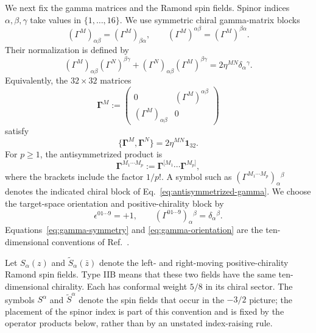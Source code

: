\documentclass[12pt]{article}
\numberwithin{equation}{section}
\newcommand{\id}{\mathbf{1}}
\begin{document}
We next fix the gamma matrices and the Ramond spin fields.  Spinor indices
$\alpha,\beta,\gamma$ take values in $\{1,\ldots,16\}$.  We use symmetric
chiral gamma-matrix blocks
\begin{equation}
(\Gamma^M)_{\alpha\beta}=(\Gamma^M)_{\beta\alpha},
\qquad
(\Gamma^M)^{\alpha\beta}=(\Gamma^M)^{\beta\alpha}.
\label{eq:gamma-symmetry}
\end{equation}
Their normalization is defined by
\begin{equation}
(\Gamma^M)_{\alpha\beta}(\Gamma^N)^{\beta\gamma}
+(\Gamma^N)_{\alpha\beta}(\Gamma^M)^{\beta\gamma}
=2\eta^{MN}\delta_\alpha{}^\gamma.
\label{eq:chiral-clifford}
\end{equation}
Equivalently, the $32\times32$ matrices
\begin{equation}
\boldsymbol\Gamma^M
:=
\begin{pmatrix}
0&(\Gamma^M)^{\alpha\beta}\\
(\Gamma^M)_{\alpha\beta}&0
\end{pmatrix}
\label{eq:dirac-gamma-from-blocks}
\end{equation}
satisfy
\begin{equation}
\{\boldsymbol\Gamma^M,\boldsymbol\Gamma^N\}
=2\eta^{MN}\id_{32}.
\label{eq:dirac-clifford}
\end{equation}
For $p\geq1$, the antisymmetrized product is
\begin{equation}
\boldsymbol\Gamma^{M_1\cdots M_p}
:=\boldsymbol\Gamma^{[M_1}\cdots\boldsymbol\Gamma^{M_p]},
\label{eq:antisymmetrized-gamma}
\end{equation}
where the brackets include the factor $1/p!$.  A symbol such as
$(\Gamma^{M_1\cdots M_p})_\alpha{}^\beta$ denotes the indicated chiral block
of Eq.~\eqref{eq:antisymmetrized-gamma}.  We choose the target-space
orientation and positive-chirality block by
\begin{equation}
\epsilon^{01\cdots9}=+1,
\qquad
(\Gamma^{01\cdots9})_\alpha{}^\beta
=\delta_\alpha{}^\beta.
\label{eq:gamma-orientation}
\end{equation}
Equations~\eqref{eq:gamma-symmetry} and \eqref{eq:gamma-orientation} are the
ten-dimensional conventions of Ref.~\cite{Alexandrov:2021dyl}.

Let $S_\alpha(z)$ and $\widetilde S_\alpha(\bar z)$ denote the left- and
right-moving positive-chirality Ramond spin fields.  Type IIB means that
these two fields have the same ten-dimensional chirality.  Each has
conformal weight $5/8$ in its chiral sector.  The symbols $S^\alpha$ and
$\widetilde S^\alpha$ denote the spin fields that occur in the $-3/2$ picture;
the placement of the spinor index is part of this convention and is fixed by
the operator products below, rather than by an unstated index-raising rule.
\end{document}
